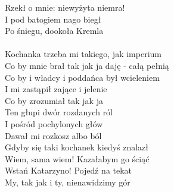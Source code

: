 \documentclass[a5paper, 10pt]{book}
\begin{document}
\begin{minipage}[t]{0.85\textwidth}
  Rzekł o mnie: niewyżyta niemra!\\
  I pod batogiem nago biegł\\
  Po śniegu, dookoła Kremla\\
  \\
  Kochanka trzeba mi takiego, jak imperium\\
  Co by mnie brał tak jak ja daję - całą pełnią\\
  Co by i władcy i poddańca był wcieleniem\\
  I mi zastąpił zające i jelenie\\
  Co by zrozumiał tak jak ja\\
  Ten głupi dwór rozdanych ról\\
  I pośród pochylonych głów\\
  Dawał mi rozkosz albo ból\\

  \hspace*{5mm}Gdyby się taki kochanek kiedyś znalazł\\
  \hspace*{5mm}Wiem, sama wiem! Kazałabym go ściąć\\

  \hspace*{3mm}Wstań Katarzyno! Pojedź na tekat\\
  \hspace*{3mm}My, tak jak i ty, nienawidzimy gór\\

\end{minipage}
\end{document}
